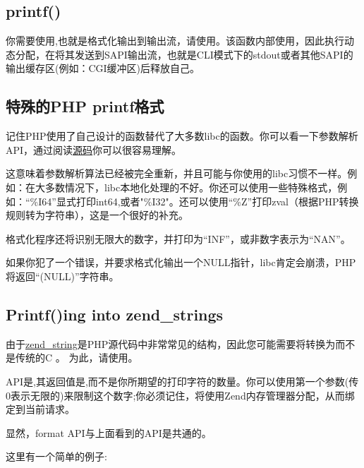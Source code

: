 \subsection{printf()}

你需要使用,也就是格式化输出到输出流，请使用。该函数内部使用，因此执行动态分配，在将其发送到SAPI输出流，也就是CLI模式下的stdout或者其他SAPI的输出缓存区(例如：CGI缓冲区)后释放自己。

\subsection{特殊的PHP printf格式}

记住PHP使用了自己设计的函数替代了大多数libc的函数。你可以看一下参数解析API，通过阅读\href{https://github.com/php/php-src/blob/509f5097ab0b578adc311c720afcea8de266aadd/main/spprintf.c#L203}{源码}你可以很容易理解。

这意味着参数解析算法已经被完全重新，并且可能与你使用的libc习惯不一样。例如：在大多数情况下，libc本地化处理的不好。你还可以使用一些特殊格式，例如：“\%I64”显式打印int64,或者"\%I32"。还可以使用“\%Z”打印zval（根据PHP转换规则转为字符串），这是一个很好的补充。

格式化程序还将识别无限大的数字，并打印为“INF”，或非数字表示为“NAN”。

如果你犯了一个错误，并要求格式化输出一个NULL指针，libc肯定会崩溃，PHP将返回“(NULL)”字符串。


\subsection{Printf()ing into zend\_strings}

由于\hyperref[sec:zend_string]{zend\_string}是PHP源代码中非常常见的结构，因此您可能需要将转换为而不是传统的C 。 为此，请使用。

API是,其返回值是,而不是你所期望的打印字符的数量。你可以使用第一个参数(传0表示无限的)来限制这个数字;你必须记住，将使用Zend内存管理器分配，从而绑定到当前请求。

显然，format API与上面看到的API是共通的。

这里有一个简单的例子:

